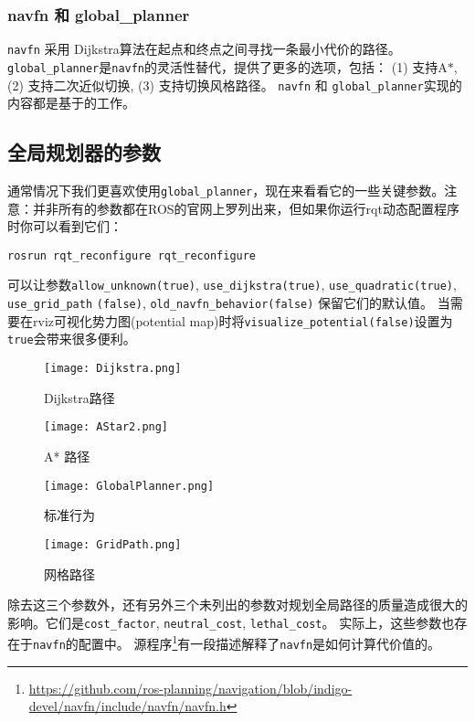 \subsubsection[navfn and global\_planner]{navfn 和 global\_planner}

\texttt{navfn} 采用 Dijkstra算法在起点和终点之间寻找一条最小代价的路径。
\texttt{global_planner}是\texttt{navfn}的灵活性替代，提供了更多的选项，包括：
(1) 支持A$*$, (2) 支持二次近似切换, (3) 支持切换风格路径。
\texttt{navfn} 和 \texttt{global_planner}实现的内容都是基于\cite{brock1999high}的工作。

\subsection[Global Planner Parameters]{全局规划器的参数}

通常情况下我们更喜欢使用\texttt{global_planner}，现在来看看它的一些关键参数。注意：并非所有的参数都在ROS的官网上罗列出来，但如果你运行rqt动态配置程序时你可以看到它们：
\begin{verbatim}
rosrun rqt_reconfigure rqt_reconfigure
\end{verbatim}
可以让参数\texttt{allow_unknown(true)}, \texttt{use_dijkstra(true)},  \texttt{use_quadratic(true)},  \texttt{use_grid_path} \texttt{(false)},  \texttt{old_navfn_behavior(false)} 保留它们的默认值。
当需要在rviz可视化势力图(potential map)时将\texttt{visualize_potential(false)}设置为\texttt{true}会带来很多便利。

\begin{figure}[!htb]
	\texttt{[image: Dijkstra.png]}
	\caption{Dijkstra路径}
	\endminipage\hfill
	\texttt{[image: AStar2.png]}
	\caption{A* 路径}
	\endminipage\hfill
\end{figure}

\begin{figure}[!htb]
	\texttt{[image: GlobalPlanner.png]}
	\caption{标准行为}
	\endminipage\hfill
	\texttt{[image: GridPath.png]}
	\caption{网格路径}
	\endminipage\hfill
\end{figure}

除去这三个参数外，还有另外三个未列出的参数对规划全局路径的质量造成很大的影响。它们是\texttt{cost_factor}, \texttt{neutral_cost}, \texttt{lethal_cost}。
实际上，这些参数也存在于\texttt{navfn}的配置中。
源程序\footnote{\scriptsize\url{https://github.com/ros-planning/navigation/blob/indigo-devel/navfn/include/navfn/navfn.h}}有一段描述解释了\texttt{navfn}是如何计算代价值的。

